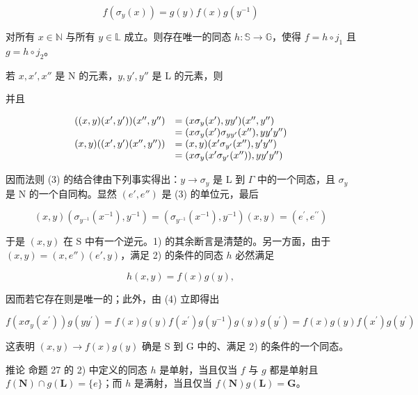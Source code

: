 \[
f (\sigma_ {y} (x)) = g (y) f (x) g (y ^ {- 1})\tag{4}
\]

对所有 \(x \in \mathbb{N}\) 与所有 \(y \in \mathbb{L}\) 成立。则存在唯一的同态 \(h: \mathbb{S} \to \mathbb{G}\)，使得 \(f = h \circ j_1\) 且 \(g = h \circ j_2\)。

若 \(x, x', x''\) 是 N 的元素，\(y, y', y''\) 是 L 的元素，则

并且

\[
\begin{array}{r l} ((x, y) (x ^ {\prime}, y ^ {\prime})) (x ^ {\prime \prime}, y ^ {\prime \prime}) & = (x \sigma_ {y} (x ^ {\prime}), y y ^ {\prime}) (x ^ {\prime \prime}, y ^ {\prime \prime}) \\ & = (x \sigma_ {y} (x ^ {\prime}) \sigma_ {y y ^ {\prime}} (x ^ {\prime \prime}), y y ^ {\prime} y ^ {\prime \prime}) \\ (x, y) ((x ^ {\prime}, y ^ {\prime}) (x ^ {\prime \prime}, y ^ {\prime \prime})) & = (x, y) (x ^ {\prime} \sigma_ {y ^ {\prime}} (x ^ {\prime \prime}), y ^ {\prime} y ^ {\prime \prime}) \\ & = (x \sigma_ {y} (x ^ {\prime} \sigma_ {y ^ {\prime}} (x ^ {\prime \prime})), y y ^ {\prime} y ^ {\prime \prime}) \end{array}
\]

因而法则 (3) 的结合律由下列事实得出：\(y \to \sigma_{y}\) 是 L 到 \(\Gamma\) 中的一个同态，且 \(\sigma_{y}\) 是 N 的一个自同构。显然 \((e', e'')\) 是 (3) 的单位元，最后

\[
(x, y) \left(\sigma_ {y ^ {- 1}} (x ^ {- 1}), y ^ {- 1}\right) = \left(\sigma_ {y ^ {- 1}} (x ^ {- 1}), y ^ {- 1}\right) (x, y) = \left(e ^ {\prime}, e ^ {\prime \prime}\right)
\]

于是 \((x, y)\) 在 S 中有一个逆元。1) 的其余断言是清楚的。另一方面，由于 \((x, y) = (x, e'') (e', y)\)，满足 2) 的条件的同态 \(h\) 必然满足

\[
h (x, y) = f (x) g (y),
\]

因而若它存在则是唯一的；此外，由 (4) 立即得出

\[
f \left(x \sigma_ {y} (x ^ {\prime})\right) g (y y ^ {\prime}) = f (x) g (y) f (x ^ {\prime}) g (y ^ {- 1}) g (y) g (y ^ {\prime}) = f (x) g (y) f (x ^ {\prime}) g (y ^ {\prime})
\]

这表明 \((x, y) \to f(x)g(y)\) 确是 S 到 G 中的、满足 2) 的条件的一个同态。

推论 命题 27 的 2) 中定义的同态 \(h\) 是单射，当且仅当 \(f\) 与 \(g\) 都是单射且 \(f(\mathbf{N}) \cap g(\mathbf{L}) = \{e\}\)；而 \(h\) 是满射，当且仅当 \(f(\mathbf{N})g(\mathbf{L}) = \mathbf{G}\)。

